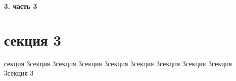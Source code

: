 \newpage
\begin{center}
  \textbf{\large 3. часть 3}
\end{center}


\section{секция 3}

секция 3секция 3секция 3секция 3секция 3секция 3секция 3секция 3секция 3секция 3
